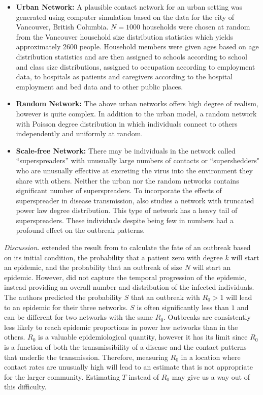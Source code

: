 \documentclass[10pt, journal,onecolumn]{IEEEtran}
\begin{document}
\begin{itemize}
\item \textbf{Urban Network:} A plausible contact network for an urban setting was generated using
  computer simulation based on the data for the city of Vancouver, British Columbia. $N=1000$
  households were chosen at random from the Vancouver household size distribution statistics which
  yields approximately 2600 people. Household members were given ages based on age distribution
  statistics and are then assigned to schools according to school and class size distributions,
  assigned to occupation according to employment data, to hospitals as patients and caregivers
  according to the hospital employment and bed data and to other public places.
\item \textbf{Random Network:} The above urban networks offers high degree of realism, however is quite complex. In
  addition to the urban model, a random network with Poisson degree distribution in which
  individuals connect to others independently and uniformly at random.
\item \textbf{Scale-free Network:} There may be individuals in the network called ``superspreaders''
  with unusually large numbers of contacts or ``supershedders" who are unusually effective at
  excreting the virus into the environment they share with others. Neither the urban nor the random
  networks contains significant number of superspreaders. To incorporate the effects of
  superspreader in disease transmission, \citep{meyers2005network} also studies a network with
  truncated power law degree distribution. This type of network has a heavy tail of superspreaders.
  These individuals despite being few in numbers had a profound effect on the outbreak patterns.
\end{itemize}

\textit{Discussion.} \citep{meyers2005network} extended the result from \citep{newman2002spread} to calculate the fate
of an outbreak based on its initial condition, the probability that a patient zero with degree $k$ will
start an epidemic, and the probability that an outbreak of size $N$ will start an epidemic. However,
\citep{newman2002spread} did not capture the temporal progression of the epidemic, instead
providing an overall number and distribution of the infected individuals.
The authors predicted the probability $S$
that an outbreak with $R_0>1$ will lead to an epidemic for their three networks. $S$ is often
significantly less than $1$ and can be different for two networks with the same $R_0$. Outbreaks
are consistently less likely to reach epidemic proportions in power law networks than in
the others. $R_0$ is a valuable epidemiological quantity, however it has its limit since $R_0$ is
a function of both the transmissibility of a disease and the contact patterns that underlie the
transmission. Therefore, measuring $R_0$ in a location where contact rates are unusually high will
lead to an estimate that is not appropriate for the larger community. Estimating $T$ instead of
$R_0$ may give us a way out of this difficulty.
\end{document}
